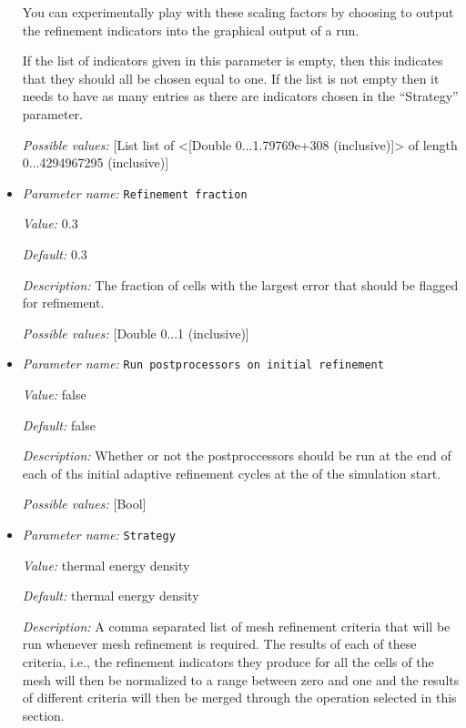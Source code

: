 \begin{itemize}
You can experimentally play with these scaling factors by choosing to output the refinement indicators into the graphical output of a run.

If the list of indicators given in this parameter is empty, then this indicates that they should all be chosen equal to one. If the list is not empty then it needs to have as many entries as there are indicators chosen in the ``Strategy'' parameter.


{\it Possible values:} [List list of <[Double 0...1.79769e+308 (inclusive)]> of length 0...4294967295 (inclusive)]
\item {\it Parameter name:} {\tt Refinement fraction}
\label{parameters:Mesh refinement/Refinement fraction}


{\it Value:} 0.3


{\it Default:} 0.3


{\it Description:} The fraction of cells with the largest error that should be flagged for refinement.


{\it Possible values:} [Double 0...1 (inclusive)]
\item {\it Parameter name:} {\tt Run postprocessors on initial refinement}
\label{parameters:Mesh refinement/Run postprocessors on initial refinement}


{\it Value:} false


{\it Default:} false


{\it Description:} Whether or not the postproccessors should be run at the end of each of ths initial adaptive refinement cycles at the of the simulation start.


{\it Possible values:} [Bool]
\item {\it Parameter name:} {\tt Strategy}
\label{parameters:Mesh refinement/Strategy}


{\it Value:} thermal energy density


{\it Default:} thermal energy density


{\it Description:} A comma separated list of mesh refinement criteria that will be run whenever mesh refinement is required. The results of each of these criteria, i.e., the refinement indicators they produce for all the cells of the mesh will then be normalized to a range between zero and one and the results of different criteria will then be merged through the operation selected in this section.


\end{itemize}
